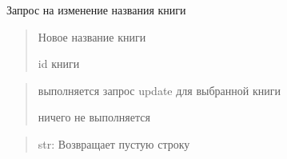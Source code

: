 \documentclass[letterpaper,10pt,russian]{sphinxmanual}
\begin{document}
\begin{fulllineitems}
\label{\detokenize{blueprints:blueprints.change_book_information.change_title}}
\pysigstartsignatures
{}
\pysigstopsignatures
\sphinxAtStartPar
Запрос на изменение названия книги
\begin{description}
\begin{quote}\begin{description}
\sphinxAtStartPar
Новое название книги

\sphinxAtStartPar
id книги

\end{description}\end{quote}

\begin{quote}\begin{description}
\sphinxAtStartPar
выполняется запрос update для выбранной книги

\sphinxAtStartPar
ничего не выполняется

\end{description}\end{quote}

\end{description}
\begin{quote}\begin{description}
\sphinxAtStartPar
str: Возвращает пустую строку

\end{description}\end{quote}

\end{fulllineitems}

\end{document}
